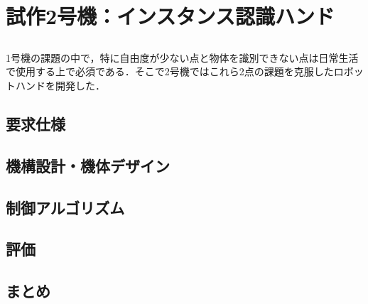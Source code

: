 \chapter{試作2号機：インスタンス認識ハンド}
\newpage

\section{}
1号機の課題の中で，特に自由度が少ない点と物体を識別できない点は日常生活で使用する上で必須である．そこで2号機ではこれら2点の課題を克服したロボットハンドを開発した．

\section{要求仕様}


\section{機構設計・機体デザイン}



\section{制御アルゴリズム}


\section{評価}


\section{まとめ}





